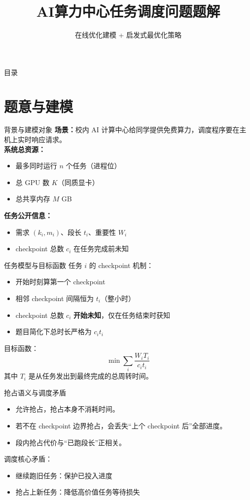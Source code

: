 \documentclass[10pt,aspectratio=169]{beamer}
\title{AI算力中心任务调度问题题解}
\subtitle{在线优化建模 + 启发式最优化策略}
\institute{第二届CCF算法能力大赛（CACC）区域赛}
\date{}
\begin{document}
\begin{frame}
  \titlepage
\end{frame}

\begin{frame}{目录}
  \tableofcontents
\end{frame}

\section{题意与建模}

\begin{frame}{背景与建模对象}
\textbf{场景：}校内 AI 计算中心给同学提供免费算力，调度程序要在主机上实时响应请求。\\[4pt]
\textbf{系统总资源：}
\begin{itemize}
  \item 最多同时运行 $n$ 个任务（进程位）
  \item 总 GPU 数 $K$（同质显卡）
  \item 总共享内存 $M$ GB
\end{itemize}
\textbf{任务公开信息：}
\begin{itemize}
  \item 需求 $(k_i,m_i)$、段长 $t_i$、重要性 $W_i$
  \item checkpoint 总数 $c_i$ 在任务完成前未知
\end{itemize}
\end{frame}

\begin{frame}{任务模型与目标函数}
任务 $i$ 的 checkpoint 机制：
\begin{itemize}
  \item 开始时刻算第一个 checkpoint
  \item 相邻 checkpoint 间隔恒为 $t_i$（整小时）
  \item checkpoint 总数 $c_i$ \textbf{开始未知}，仅在任务结束时获知
  \item 题目简化下总时长严格为 $c_i t_i$
\end{itemize}
目标函数：
\[
\min \sum_i \frac{W_i T_i}{c_i t_i}
\]
其中 $T_i$ 是从任务发出到最终完成的总周转时间。
\end{frame}

\begin{frame}{抢占语义与调度矛盾}
\begin{itemize}
  \item 允许抢占，抢占本身不消耗时间。
  \item 若不在 checkpoint 边界抢占，会丢失“上个 checkpoint 后”全部进度。
  \item 段内抢占代价与“已跑段长”正相关。
\end{itemize}
\vspace{4pt}
调度核心矛盾：
\begin{itemize}
  \item 继续跑旧任务：保护已投入进度
  \item 抢占上新任务：降低高价值任务等待损失
\end{itemize}
\end{frame}
\end{document}
